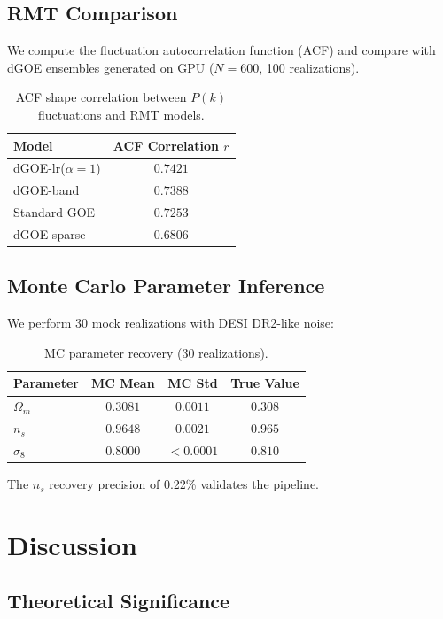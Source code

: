 \documentclass[12pt,a4paper]{article}
\begin{document}
\subsection{RMT Comparison}

We compute the fluctuation autocorrelation function (ACF) and compare with dGOE ensembles generated on GPU ($N = 600$, 100 realizations).

\begin{table}[h]
\centering
\begin{tabular}{l|c}
\hline
\textbf{Model} & \textbf{ACF Correlation $r$} \\
\hline
dGOE-lr($\alpha=1$) & $\mathbf{0.7421}$ \\
dGOE-band & $0.7388$ \\
Standard GOE & $0.7253$ \\
dGOE-sparse & $0.6806$ \\
\hline
\end{tabular}
\caption{ACF shape correlation between $P(k)$ fluctuations and RMT models.}
\end{table}

\subsection{Monte Carlo Parameter Inference}

We perform 30 mock realizations with DESI DR2-like noise:

\begin{table}[h]
\centering
\begin{tabular}{l|c|c|c}
\hline
\textbf{Parameter} & \textbf{MC Mean} & \textbf{MC Std} & \textbf{True Value} \\
\hline
$\Omega_m$ & $0.3081$ & $0.0011$ & $0.308$ \\
$n_s$ & $0.9648$ & $0.0021$ & $0.965$ \\
$\sigma_8$ & $0.8000$ & $<0.0001$ & $0.810$ \\
\hline
\end{tabular}
\caption{MC parameter recovery (30 realizations).}
\end{table}

The $n_s$ recovery precision of 0.22\% validates the pipeline.

\section{Discussion}

\subsection{Theoretical Significance}
\end{document}
